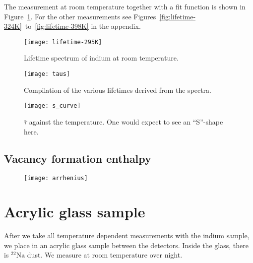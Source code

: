 \documentclass[11pt, english, fleqn, DIV=15, headinclude, BCOR=2cm]{scrreprt}
\begin{document}
The measurement at room temperature together with a fit function is shown in
Figure~\ref{fig:lifetime-295K}. For the other measurements see
Figures~\ref{fig:lifetime-324K}~to~\ref{fig:lifetime-398K} in the appendix.

\begin{figure}
    \centering
    \texttt{[image: lifetime-295K]}
    \caption{%
        Lifetime spectrum of indium at room temperature.
    }
    \label{fig:lifetime-295K}
\end{figure}

\begin{figure}
    \centering
    \texttt{[image: taus]}
    \caption{%
        Compilation of the various lifetimes derived from the spectra.
    }
    \label{fig:taus}
\end{figure}

\begin{figure}
    \centering
    \texttt{[image: s\_curve]}
    \caption{%
        $\bar\tau$ against the temperature. One would expect to see an
        \enquote{S}-shape here.
    }
    \label{fig:s_curve}
\end{figure}

\subsection{Vacancy formation enthalpy}

\begin{figure}
    \centering
    \texttt{[image: arrhenius]}
    \caption{%
    }
    \label{fig:arrhenius}
\end{figure}

\section{Acrylic glass sample}

After we take all temperature dependent measurements with the indium sample, we
place in an acrylic glass sample between the detectors. Inside the glass, there
is $\mathrm{^{22}Na}$ dust. We measure at room temperature over night.
\end{document}
